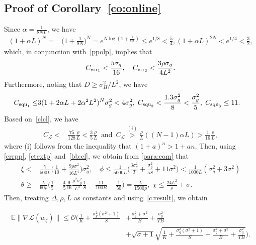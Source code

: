 \documentclass{osudissert96}
\begin{document}
\subsection*{Proof of Corollary~\ref{co:online}}
	Since $\alpha = \frac{1}{8NL}$, we have 
	\begin{align*}
	(1+\alpha L)^ N = &\big(1+ \frac{1}{8N}\big)^N = e^{N\log(1+\frac{1}{8N})} \leq e^{1/8}  < \frac{5}{4},
	(1+\alpha L)^ {2N} < e^{1/4} <  \frac{3}{2},
	\end{align*}
	which, in conjunction with~\cref{ppolp}, implies that 
	\begin{align}\label{errpp}
	C_{{\text{\normalfont err}}_1}  < \frac{5\sigma_g}{16},\quad C_{{\text{\normalfont err}}_2} < \frac{3\rho \sigma_g}{4L^2}.
	\end{align}
	Furthermore, noting that $D \geq \sigma_H^2/L^2$, we have
	\begin{align}\label{ctextp}
	C_{\text{\normalfont squ}_1} \leq &3(1+2\alpha L + 2\alpha^2 L^2)^N\sigma_g^2 <4\sigma_g^2, \; C_{\text{\normalfont squ}_2} < \frac{1.3\sigma^{2}_g}{8} < \frac{\sigma_g^2}{5},\; C_{\text{\normalfont squ}_3} \leq 11.
	\end{align}
	Based on~\cref{clcl}, we have 
	\begin{align}\label{bb:cl}
	C_{\mathcal{L}}<& \frac{75}{128}\frac{\rho}{L}<\frac{3}{5}\frac{\rho}{L} \,\text{ and } \,C_{\mathcal{L}} \overset{(i)}>  \frac{\rho}{L} ((N-1) \alpha L) > \frac{1}{16}\frac{\rho}{L},
	\end{align}
	where (i) follows from the inequality that $(1+a)^n > 1 +an$. 
	Then, using \cref{errpp}, \cref{ctextp} and~\cref{bb:cl}, we obtain from \cref{para:com} that 
	\begin{align}\label{manypara}
	\xi < &\frac{7}{500L} \Big( \frac{1}{10} + \frac{9\rho\sigma^2}{16L^4}\Big)\sigma_g^2,\quad \phi \leq \frac{1}{5000L} \Big( \frac{3\sigma_g^2}{T} + \frac{\sigma_g^2}{5S} + 11\sigma^2\Big) < \frac{1}{1000L}(\sigma_g^2 + 3\sigma^2)  \nonumber
	\\ \theta \geq & \frac{L}{60\rho} \Big( \frac{1}{5} - \frac{4}{5} \frac{9}{16} \frac{\rho^2\sigma_g^2}{L^4}\frac{1}{S}  - \frac{11}{100B} - \frac{1}{50}\Big) 
	 = \frac{L}{1500\rho},\; \chi \leq   \frac{24L^2}{\rho} +\sigma.
	\end{align}
	Then, treating $\Delta, \rho, L$ as constants and using~\cref{c:result}, we obtain
	\begin{small}
	\begin{align*}
	\mathbb{E}\|\nabla \mathcal{L}(w_\zeta) \|  \leq \mathcal{O} \Big(  \frac{1}{K} + \frac{\sigma_g^2(\sigma^2+1)}{S} &+ \frac{\sigma_g^2 +\sigma^2}{B} +\frac{\sigma^2_g}{TB}
	\\&+ \sqrt{\sigma +1}\sqrt{\frac{1}{K} + \frac{\sigma_g^2(\sigma^2+1)}{S} + \frac{\sigma_g^2 +\sigma^2}{B}+\frac{\sigma^2_g}{TB}}\Big).
	\end{align*}
	\end{small}
\end{document}
